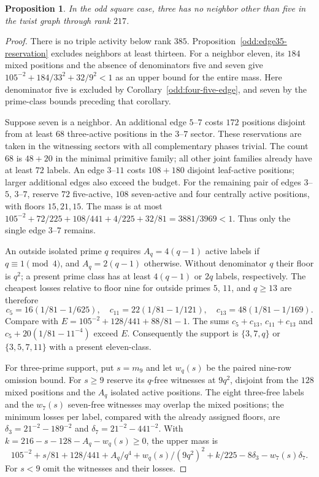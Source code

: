 \documentclass[11pt]{amsart}
\numberwithin{equation}{section}
\newtheorem{proposition}[theorem]{Proposition}
\theoremstyle{definition}
\theoremstyle{plain}
\begin{document}
\begin{proposition}\label{odd:large-ternary-edge}
In the odd square case, three has no neighbor other than five in
the twist graph through rank $217$.
\end{proposition}
\begin{proof}
There is no triple activity below rank $385$.
Proposition~\ref{odd:edge35-reservation} excludes neighbors at least
thirteen. For a neighbor eleven, its $184$ mixed positions and the
absence of denominators five and seven give
$105^{-2}+184/33^2+32/9^2<1$ as an upper bound for the entire mass.
Here denominator five is excluded by
Corollary~\ref{odd:four-five-edge}, and seven by the prime-class
bounds preceding that corollary.

Suppose seven is a neighbor. An additional edge $5$--$7$ costs
$172$ positions disjoint from at least $68$ three-active positions
in the $3$--$7$ sector. These reservations are taken in the
witnessing sectors with all complementary phases trivial.
The count $68$ is $48+20$ in the minimal primitive family; all
other joint families already have at least $72$ labels.
An edge $3$--$11$ costs $108+180$ disjoint leaf-active positions;
larger additional edges also exceed the budget. For the remaining
pair of edges $3$--$5$, $3$--$7$, reserve $72$ five-active,
$108$ seven-active and four centrally active positions, with floors
$15,21,15$. The mass is at most
$105^{-2}+72/225+108/441+4/225+32/81=3881/3969<1$.
Thus only the single edge $3$--$7$ remains.

An outside isolated prime $q$ requires
$A_q=4(q-1)$ active labels if $q\equiv1\pmod4$, and $A_q=2(q-1)$
otherwise. Without denominator $q$ their floor is $q^2$; a present
prime class has at least $4(q-1)$ or $2q$ labels, respectively.
The cheapest losses relative to floor nine for outside primes
$5$, $11$, and $q\ge13$ are therefore
\[
 c_5=16(1/81-1/625),\quad c_{11}=22(1/81-1/121),\quad
 c_{13}=48(1/81-1/169).
\]
Compare with $E=105^{-2}+128/441+88/81-1$.
The sums $c_5+c_{13}$, $c_{11}+c_{13}$ and
$c_5+20(1/81-11^{-4})$ exceed $E$. Consequently the support is
$\{3,7,q\}$ or $\{3,5,7,11\}$ with a present eleven-class.

For three-prime support, put $s=m_9$ and let $w_q(s)$ be the paired
nine-row omission bound. For $s\ge9$ reserve its $q$-free witnesses
at $9q^2$, disjoint from the $128$ mixed positions and the $A_q$
isolated active positions. The eight three-free labels and the
$w_7(s)$ seven-free witnesses may overlap the mixed positions;
the minimum losses per label, compared with the already assigned
floors, are
$\delta_3=21^{-2}-189^{-2}$ and
$\delta_7=21^{-2}-441^{-2}$. With
$k=216-s-128-A_q-w_q(s)\ge0$, the upper mass is
\[
 105^{-2}+s/81+128/441+A_q/q^4+w_q(s)/(9q^2)^2
       +k/225-8\delta_3-w_7(s)\delta_7.
\]
For $s<9$ omit the witnesses and their losses.


\end{proof}
\end{document}
